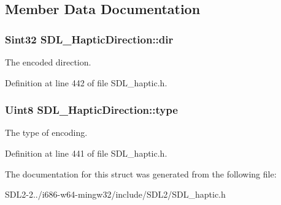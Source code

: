 \subsection{Member Data Documentation}
\hypertarget{structSDL__HapticDirection_a6b1083eefcfe8db7d9bbfd660e0373a9}{
\subsubsection[{dir}]{\setlength{\rightskip}{0pt plus 5cm}Sint32 S\+D\+L\+\_\+\+Haptic\+Direction\+::dir}}\label{structSDL__HapticDirection_a6b1083eefcfe8db7d9bbfd660e0373a9}
The encoded direction. 

Definition at line 442 of file S\+D\+L\+\_\+haptic.\+h.

\hypertarget{structSDL__HapticDirection_acd6830ad68c4ba2af16057fa418087cc}{
\subsubsection[{type}]{\setlength{\rightskip}{0pt plus 5cm}Uint8 S\+D\+L\+\_\+\+Haptic\+Direction\+::type}}\label{structSDL__HapticDirection_acd6830ad68c4ba2af16057fa418087cc}
The type of encoding. 

Definition at line 441 of file S\+D\+L\+\_\+haptic.\+h.



The documentation for this struct was generated from the following file\+:\begin{DoxyCompactItemize}
\item 
S\+D\+L2-\/2../i686-\/w64-\/mingw32/include/\+S\+D\+L2/S\+D\+L\+\_\+haptic.\+h\end{DoxyCompactItemize}

